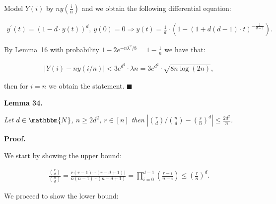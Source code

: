 \documentclass[10pt,a4paper]{article}
\begin{document}
Model $Y(i)$ by $ny\left(\frac{i}{n}\right)$ and we obtain the following differential equation:\par


\[\begin{gathered}
\displaystyle y^{\prime}(t)=\left(1-d\cdot y(t)\right)^{d},\ y(0)=0\Rightarrow y(t)=\frac{1}{d}\cdot\left(1-\left(1+d(d-1)\cdot t\right)^{-\frac{1}{d-1}}\right).
\end{gathered}\]


By Lemma 16 with probability $1-2e^{-n\lambda^{2}/8}=1-\frac{1}{n}$ we have that:\par


\[\begin{gathered}
\displaystyle\bigl|Y(i)-ny(i/n)\bigr|<3e^{d^{2}}\cdot\lambda n=3e^{d^{2}}\cdot\sqrt{8n\log(2n)},
\end{gathered}\]


then for $i=n$ we obtain the statement.
\ensuremath{\blacksquare}\par






\par\medskip\noindent\textbf{\textbf{Lemma 34}\textbf{.}}\par



\emph{Let $d\in\mathbbm{N}$, $n\geq 2d^{2}$, $r\in[n]$
then $|\binom{r}{d}/\binom{n}{d}-\left(\frac{r}{n}\right)^{d}|\leq\frac{2d^{2}}{n}$.}\par






\par\medskip\noindent\textbf{Proof.}\par



We start by showing the upper bound:\par


\[\begin{gathered}
\displaystyle\frac{\binom{r}{d}}{\binom{n}{d}}=\frac{r(r-1)\cdots(r-d+1))}{n(n-1)\cdots(n-d+1)}=\prod_{i=0}^{d-1}\left(\frac{r-i}{n-i}\right)\leq\left(\frac{r}{n}\right)^{d}.
\end{gathered}\]


We proceed to show the lower bound:\par
\end{document}
